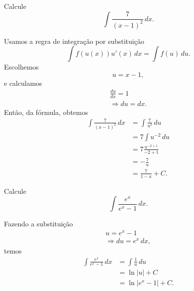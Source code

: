 \begin{exeresol}
  Calcule
  \begin{equation}
    \int \frac{7}{(x-1)^2}\,dx.
  \end{equation}
\end{exeresol}
\begin{resol}
  Usamos a regra de integração por substituição
  \begin{equation}
    \int f(u(x))u'(x)\,dx = \int f(u)\,du.
  \end{equation}
  Escolhemos
  \begin{equation}
    u = x-1,
  \end{equation}
  e calculamos
  \begin{gather}
    \frac{du}{dx} = 1\\
    \Rightarrow du = dx.
  \end{gather}
  Então, da fórmula, obtemos
  \begin{align}
    \int \frac{7}{(x-1)^2}\,dx &= \int \frac{7}{u^2}\,du\\
                               &= 7\int u^{-2}\,du\\
                               &= 7\frac{u^{-2+1}}{-2+1}\\
                               &= -\frac{7}{u}\\
                               &= \frac{7}{1-x} + C.
  \end{align}
\end{resol}

\begin{exeresol}
  Calcule
  \begin{equation}
    \int \frac{e^x}{e^x - 1}\,dx.
  \end{equation}
\end{exeresol}
\begin{resol}
  Fazendo a substituição
  \begin{gather}
    u = e^x-1\\
    \Rightarrow du = e^x\,dx,
  \end{gather}
  temos
  \begin{align}
    \int \frac{e^x}{e^x - 1}\,dx &= \int \frac{1}{u}\,du \\
                                 &= \ln|u| + C \\
                                 &= \ln|e^x-1|+C.
  \end{align}
\end{resol}


